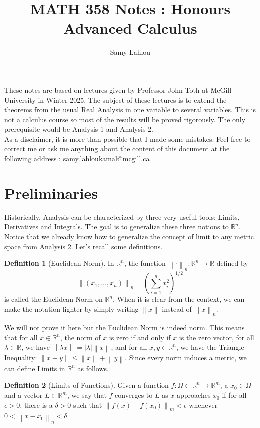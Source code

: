 \documentclass{article}
\title{MATH 358 Notes : Honours Advanced Calculus}
\author{Samy Lahlou}
\date{}
\theoremstyle{plain}
\theoremstyle{definition}
\newtheorem*{definition}{Definition}
\newcommand{\R}{\mathbb{R}}
\newcommand{\lnorm}[2]{\left\lVert#2 \right\rVert_{#1}}
\newcommand{\norm}[1]{\left\lVert#1 \right\rVert}
\begin{document}
\maketitle

These notes are based on lectures given by Professor John Toth at McGill University in Winter 2025. The subject of these lectures is to extend the theorems from the usual Real Analysis in one variable to several variables. This is not a calculus course so most of the results will be proved rigorously. The only prerequisite would be Analysis 1 and Analysis 2. \\
As a disclaimer, it is more than possible that I made some mistakes. Feel free to correct me or ask me anything about the content of this document at the following address : samy.lahloukamal@mcgill.ca

\tableofcontents

\newpage

\section{Preliminaries}

Historically, Analysis can be characterized by three very useful tools: Limits, Derivatives and Integrals. The goal is to generalize these three notions to $\R^n$. Notice that we already know how to generalize the concept of limit to any metric space from Analysis 2. Let's recall some definitions.

\begin{definition}[Euclidean Norm]
    In $\R^n$, the function $\lnorm{n}{\cdot} : \R^n \to \R$ defined by
    $$\lnorm{n}{(x_1, ..., x_n)} = \left(\sum_{i=1}^{n}x_i^2\right)^{1/2}$$
    is called the Euclidean Norm on $\R^n$. When it is clear from the context, we can make the notation lighter by simply writing $\norm{x}$ instead of $\lnorm{n}{x}$.
\end{definition}

We will not prove it here but the Euclidean Norm is indeed norm. This means that for all $x \in \R^n$, the norm of $x$ is zero if and only if $x$ is the zero vector, for all $\lambda \in \R$, we have $\norm{\lambda x} = |\lambda| \norm{x}$, and for all $x, y \in \R^n$, we have the Triangle Inequality: $\norm{x+y} \leq \norm{x} + \norm{y}$. Since every norm induces a metric, we can define Limits in $\R^n$ as follows.

\begin{definition}[Limits of Functions]
    Given a function $f : \Omega \subset \R^n \to \R^m$, a $x_0 \in \overline{\Omega}$ and a vector $L \in \R^m$, we say that $f$ converges to $L$ as $x$ approaches $x_0$ if for all $\epsilon > 0$, there is a $\delta > 0$ such that $\lnorm{m}{f(x) - f(x_0)} < \epsilon$ whenever $0<\lnorm{n}{x-x_0}<\delta$.
\end{definition}
\end{document}
